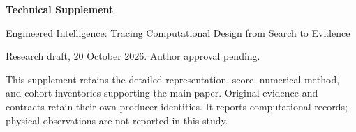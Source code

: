 \documentclass[11pt,journal,onecolumn,letterpaper]{IEEEtran}
\begin{document}
\onecolumn
\begin{center}
{\sffamily\bfseries\Large Technical Supplement}\par\medskip
{\sffamily\large Engineered Intelligence: Tracing Computational Design from Search to Evidence}\par\medskip
Research draft, 20 October 2026. Author approval pending.
\end{center}
This supplement retains the detailed representation, score, numerical-method, and cohort inventories supporting the main paper. Original evidence and contracts retain their own producer identities. It reports computational records; physical observations are not reported in this study.
\setcounter{tocdepth}{2}
\tableofcontents
\clearpage








\clearpage

\end{document}

